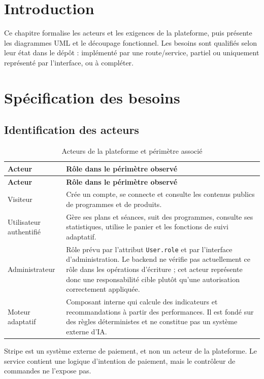 ﻿\documentclass[12pt,a4paper]{report}
\begin{document}
\section*{Introduction}
\label{c2-intro}
Ce chapitre formalise les acteurs et les exigences de la plateforme, puis présente les diagrammes UML et le découpage fonctionnel. Les besoins sont qualifiés selon leur état dans le dépôt : implémenté par une route/service, partiel ou uniquement représenté par l'interface, ou à compléter.

\section{Spécification des besoins}
\label{c2-s1}
\subsection{Identification des acteurs}
\label{c2-s1-sub1}
\begin{singlespace}
\begin{longtable}{|p{4cm}|p{11.5cm}|}
\caption{Acteurs de la plateforme et périmètre associé}\label{tab:acteurs}\\
\hline
\textbf{Acteur} & \textbf{Rôle dans le périmètre observé} \\\hline
\endfirsthead
\hline
\textbf{Acteur} & \textbf{Rôle dans le périmètre observé} \\\hline
\endhead
Visiteur & Crée un compte, se connecte et consulte les contenus publics de programmes et de produits. \\\hline
Utilisateur authentifié & Gère ses plans et séances, suit des programmes, consulte ses statistiques, utilise le panier et les fonctions de suivi adaptatif. \\\hline
Administrateur & Rôle prévu par l'attribut \texttt{User.role} et par l'interface d'administration. Le backend ne vérifie pas actuellement ce rôle dans les opérations d'écriture ; cet acteur représente donc une responsabilité cible plutôt qu'une autorisation correctement appliquée. \\\hline
Moteur adaptatif & Composant interne qui calcule des indicateurs et recommandations à partir des performances. Il est fondé sur des règles déterministes et ne constitue pas un système externe d'IA. \\\hline
\end{longtable}
\end{singlespace}
\noindent Stripe est un système externe de paiement, et non un acteur de la plateforme. Le service contient une logique d'intention de paiement, mais le contrôleur de commandes ne l'expose pas.\par
\end{document}
